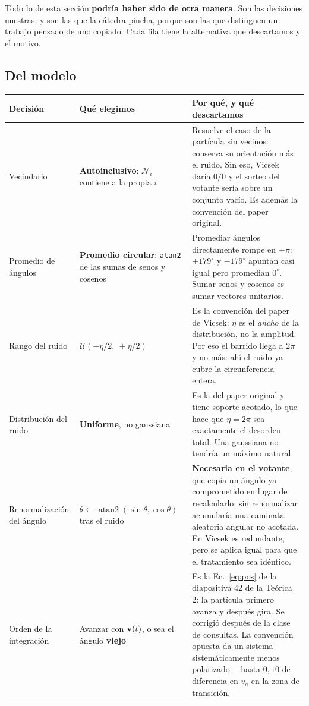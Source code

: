 \documentclass[11pt]{article}
\begin{document}
Todo lo de esta sección \textbf{podría haber sido de otra manera}. Son las
decisiones nuestras, y son las que la cátedra pincha, porque son las que
distinguen un trabajo pensado de uno copiado. Cada fila tiene la alternativa que
descartamos y el motivo.

\subsection{Del modelo}

\begin{center}
\begin{tabular}{p{3.5cm}p{4.4cm}p{5.6cm}}
  \toprule
  Decisión & Qué elegimos & Por qué, y qué descartamos \\
  \midrule
  Vecindario &
  \textbf{Autoinclusivo}: $\mathcal{N}_i$ contiene a la propia $i$ &
  Resuelve el caso de la partícula sin vecinos: conserva su orientación más el ruido. Sin eso, Vicsek daría $0/0$ y el sorteo del votante sería sobre un conjunto vacío. Es además la convención del paper original. \\
  \addlinespace
  Promedio de ángulos &
  \textbf{Promedio circular}: \texttt{atan2} de las sumas de senos y cosenos &
  Promediar ángulos directamente rompe en $\pm\pi$: $+179^\circ$ y $-179^\circ$ apuntan casi igual pero promedian $0^\circ$. Sumar senos y cosenos es sumar vectores unitarios. \\
  \addlinespace
  Rango del ruido &
  $\mathcal{U}(-\eta/2,\ +\eta/2)$ &
  Es la convención del paper de Vicsek: $\eta$ es el \emph{ancho} de la distribución, no la amplitud. Por eso el barrido llega a $2\pi$ y no más: ahí el ruido ya cubre la circunferencia entera. \\
  \addlinespace
  Distribución del ruido &
  \textbf{Uniforme}, no gaussiana &
  Es la del paper original y tiene soporte acotado, lo que hace que $\eta = 2\pi$ sea exactamente el desorden total. Una gaussiana no tendría un máximo natural. \\
  \addlinespace
  Renormalización del ángulo &
  $\theta \leftarrow \operatorname{atan2}(\sin\theta, \cos\theta)$ tras el ruido &
  \textbf{Necesaria en el votante}, que copia un ángulo ya comprometido en lugar de recalcularlo: sin renormalizar acumularía una caminata aleatoria angular no acotada. En Vicsek es redundante, pero se aplica igual para que el tratamiento sea idéntico. \\
  \addlinespace
  Orden de la integración &
  Avanzar con $\mathbf{v}(t)$, o sea el ángulo \textbf{viejo} &
  Es la Ec.~\eqref{eq:pos} de la diapositiva 42 de la Teórica 2: la partícula primero avanza y después gira. Se corrigió después de la clase de consultas. La convención opuesta da un sistema sistemáticamente menos polarizado ---hasta $0{,}10$ de diferencia en $v_a$ en la zona de transición. \\
  \bottomrule
\end{tabular}
\end{center}
\end{document}
